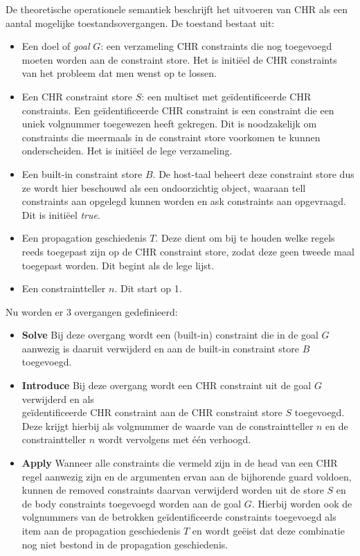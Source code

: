De theoretische operationele semantiek beschrijft het uitvoeren van CHR als een aantal mogelijke toestandsovergangen. De toestand bestaat uit: \begin{itemize}
\item Een doel of {\em goal} $G$: een verzameling CHR constraints die nog toegevoegd moeten worden aan de constraint store. Het is initi\"eel de CHR constraints van het probleem dat men wenst op te lossen.
\item Een CHR constraint store $S$: een multiset met ge\"identificeerde CHR constraints. Een ge\"identificeerde CHR constraint is een constraint die een uniek volgnummer toegewezen heeft gekregen. Dit is noodzakelijk om constraints die meermaals in de constraint store voorkomen te kunnen onderscheiden. Het is initi\"eel de lege verzameling.
\item Een built-in constraint store $B$. De host-taal beheert deze constraint store dus ze wordt hier beschouwd als een ondoorzichtig object, waaraan tell constraints aan opgelegd kunnen worden en ask constraints aan opgevraagd. Dit is initi\"eel {\em true}.
\item Een propagation geschiedenis $T$. Deze dient om bij te houden welke regels reeds toegepast zijn op de CHR constraint store, zodat deze geen tweede maal toegepast worden. Dit begint als de lege lijst. 
\item Een constraintteller $n$. Dit start op 1.
\end{itemize}

Nu worden er 3 overgangen gedefinieerd: \begin{itemize}
\item {\bf Solve} Bij deze overgang wordt een (built-in) constraint die in de goal $G$ aanwezig is daaruit verwijderd en aan de built-in constraint store $B$ toegevoegd. 
\item {\bf Introduce} Bij deze overgang wordt een CHR constraint uit de goal $G$ verwijderd en als \\ ge\"identificeerde CHR constraint aan de CHR constraint store $S$ toegevoegd. Deze krijgt hierbij als volgnummer de waarde van de constraintteller $n$ en de constraintteller $n$ wordt vervolgens met \'e\'en verhoogd.
\item {\bf Apply} Wanneer alle constraints die vermeld zijn in de head van een CHR regel aanwezig zijn en de argumenten ervan aan de bijhorende guard voldoen, kunnen de removed constraints daarvan verwijderd worden uit de store $S$ en de body constraints toegevoegd worden aan de goal $G$. Hierbij worden ook de volgnummers van de betrokken ge\"identificeerde constraints toegevoegd als item aan de propagation geschiedenis $T$ en wordt ge\"eist dat deze combinatie nog niet bestond in de propagation geschiedenis.
\end{itemize}

